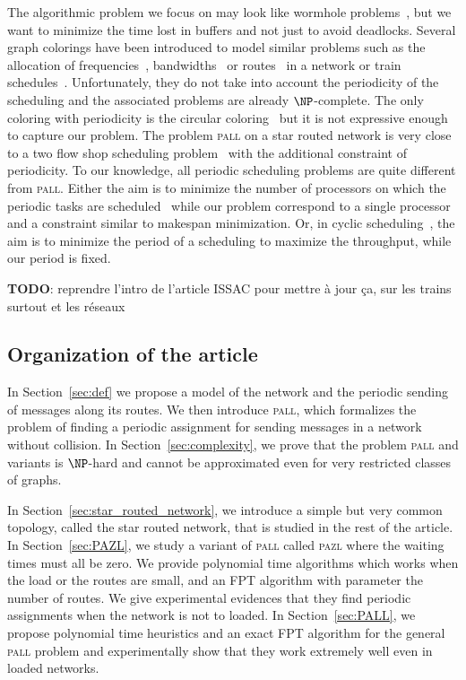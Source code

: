 \documentclass[10pt, conference, letterpaper]{IEEEtran}
\newcommand\pazl{\textsc{pazl}\xspace}
\newcommand\pall{\textsc{pall}\xspace}
\begin{document}
The algorithmic problem we focus on may look like wormhole problems~\cite{cole1996benefit}, but we want to minimize the time lost in buffers and not just to avoid deadlocks. Several graph colorings have been introduced to model similar problems such as the allocation of frequencies~\cite{borndorfer1998frequency}, bandwidths~\cite{erlebach2001complexity} or routes~\cite{cole1996benefit} in a network or train schedules~\cite{strotmann2007railway}. Unfortunately, they do not take into account the periodicity of the scheduling and the associated problems are already $\NP$-complete. The only coloring with periodicity is the circular coloring~\cite{zhou2013multiple} but it is not expressive enough to capture our problem. 
The problem \pall on a star routed network is very close to a two flow shop scheduling problem~\cite{yu2004minimizing} with the additional constraint of periodicity. To our knowledge, all periodic scheduling problems are quite different from \pall. 
Either the aim is to minimize the number of processors on which the periodic tasks are scheduled~\cite{korst1991periodic,hanen1993cyclic} while our problem correspond to a single processor and a constraint similar to makespan minimization. Or, in cyclic scheduling~\cite{levner2010complexity}, the aim is to minimize the period of a scheduling to maximize the throughput, while our period is fixed. 

\textbf{TODO}: reprendre l'intro de l'article ISSAC pour mettre à jour ça, sur les trains surtout et les
réseaux



\subsection*{Organization of the article}

 In Section~\ref{sec:def} we propose a model of the network and the periodic sending of messages along its routes.  We then introduce \pall, which formalizes the problem of finding a periodic assignment for sending messages in a network without collision. In Section~\ref{sec:complexity}, we prove that the problem \pall and variants is $\NP$-hard and cannot be approximated even for very restricted classes of graphs. 

In Section~\ref{sec:star_routed_network}, we introduce a simple but very common topology, called the star routed network, that is studied in the rest of the article.
In Section~\ref{sec:PAZL}, we study a variant of \pall called \pazl  where the waiting times must all be zero. We provide  polynomial time algorithms which works when the load or the routes are small, and an FPT algorithm with parameter the number of routes.
We give experimental evidences that they find periodic assignments when the network is not to loaded. In Section~\ref{sec:PALL}, we propose polynomial time heuristics and an exact FPT algorithm for the general \pall problem and experimentally show that they work extremely well even in loaded networks. 
\end{document}
